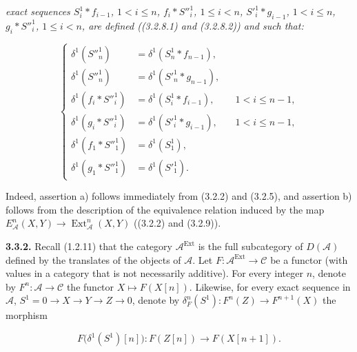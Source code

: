 \clearpage
{}%
\begingroup\small\setlength{\parskip}{0pt}\setlength{\emergencystretch}{1.5em}
\setlength{\abovedisplayskip}{4pt plus 2pt minus 2pt}%
\setlength{\belowdisplayskip}{4pt plus 2pt minus 2pt}%

\noindent\textit{exact sequences $S_i^1*f_{i-1}$, $1<i\leq n$,
$f_i*{S''}_i^1$, $1\leq i<n$, ${S'}_i^1*g_{i-1}$, $1<i\leq n$,
$g_i*{S''}_i^1$, $1\leq i<n$, are defined ((3.2.8.1) and (3.2.8.2)) and
such that:}

\begin{equation}
\left\{
\begin{aligned}
\delta^1({S''}_n^1)
  &=\delta^1(S_n^1*f_{n-1}),\\
\delta^1({S''}_n^1)
  &=\delta^1({S'}_n^1*g_{n-1}),\\
\delta^1(f_i*{S''}_i^1)
  &=\delta^1(S_i^1*f_{i-1}),&&1<i\leq n-1,\\
\delta^1(g_i*{S''}_i^1)
  &=\delta^1({S'}_i^1*g_{i-1}),&&1<i\leq n-1,\\
\delta^1(f_1*{S''}_1^1)
  &=\delta^1(S_1^1),\\
\delta^1(g_1*{S''}_1^1)
  &=\delta^1({S'}_1^1).
\end{aligned}
\right.
\tag{3.3.1.2}
\end{equation}

Indeed, assertion a) follows immediately from (3.2.2) and (3.2.5), and
assertion b) follows from the description of the equivalence relation
induced by the map
$E_{\mathcal A}^{n}(X,Y)\longrightarrow
\operatorname{Ext}_{\mathcal A}^{n}(X,Y)$ ((3.2.2) and (3.2.9)).

\medskip\noindent\textbf{3.3.2.}\quad
Recall (1.2.11) that the category $\mathcal A^{\operatorname{Ext}}$ is the
full subcategory of $D(\mathcal A)$ defined by the translates of the
objects of $\mathcal A$. Let
$F\colon\mathcal A^{\operatorname{Ext}}\longrightarrow\mathcal C$ be a
functor (with values in a category that is not necessarily additive). For
every integer $n$, denote by
$F^n\colon\mathcal A\longrightarrow\mathcal C$ the functor
$X\longmapsto F(X[n])$. Likewise, for every exact sequence in $\mathcal A$,
$S^1=0\longrightarrow X\longrightarrow Y\longrightarrow Z
\longrightarrow0$, denote by
$\delta_F^n(S^1)\colon F^n(Z)\longrightarrow F^{n+1}(X)$ the morphism

\[
F\bigl(\delta^1(S^1)[n]\bigr)
\colon F(Z[n])\longrightarrow F(X[n+1]).
\]

